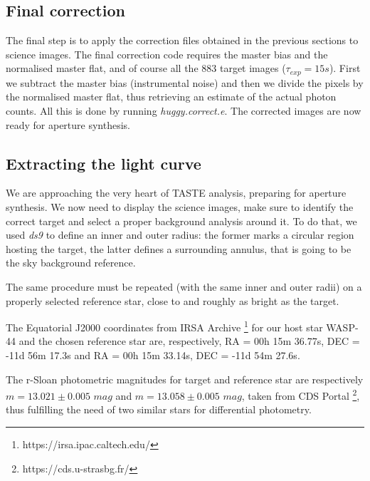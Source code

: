 \documentclass{aa}
\begin{document}
\subsection{Final correction}
The final step is to apply the correction files obtained in the 
previous sections to science images. The final correction code requires the master bias and the normalised master flat, and of course all the 883 target images ($\tau_{exp}=15s$). First we subtract the master bias (instrumental noise) and then we divide the pixels by the normalised master flat, thus retrieving an estimate of the actual photon counts. All this is done by running \textit{huggy.correct.e}.
The corrected images are now ready for aperture synthesis.


\subsection{Extracting the light curve}
We are approaching the very heart of TASTE analysis, preparing for 
aperture synthesis. We now need to display the science images, make
sure to identify the correct target and select a proper background 
analysis around it. To do that, we used \textit{ds9} to define an inner and outer radius: the former marks a circular region hosting the target, the latter defines a surrounding annulus, that is going to be the sky background reference.

The same procedure must be repeated (with the same inner and outer radii) on a properly selected reference star, close to and roughly as bright as the target. 

The Equatorial J2000 coordinates from IRSA Archive \footnote{https://irsa.ipac.caltech.edu/} for our host star WASP-44 and the chosen reference star are, respectively, RA = 00h 15m 36.77s, DEC = -11d 56m 17.3s and RA = 00h 15m 33.14s, DEC = -11d 54m 27.6s.

The r-Sloan photometric magnitudes for target and reference star are respectively $m = 13.021\pm0.005$ $mag$ and $m = 13.058 \pm 0.005$ $mag$, taken from CDS Portal \footnote{https://cds.u-strasbg.fr/}, thus fulfilling the need of two similar stars for differential photometry.
\end{document}
